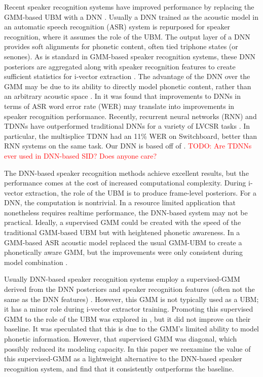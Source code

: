 \documentclass{article}
\newcommand\davidnote[1]{\textcolor{red}{#1}}
\begin{document}
Recent speaker recognition systems have improved performance by replacing 
the GMM-based UBM with a DNN \cite{lei2014, garcia2014}. 
Usually a DNN trained as the acoustic model in
an automatic speech recognition (ASR) system is repurposed for
speaker recognition, where it assumes the role of the UBM.
The output layer of a DNN provides soft alignments for
phonetic content, often tied triphone states (or senones). As is standard 
in GMM-based speaker recognition systems, these DNN posteriors are aggregated
along with speaker recognition features to create sufficient statistics for
i-vector extraction \cite{ivector}. The advantage of the DNN over the GMM may
be due to its ability to directly model phonetic content, rather than an arbitrary
acoustic space \cite{lei2014, kenny2014deep, garcia2014}. In \cite{garcia2014} it was found that
improvements to DNNs in terms of ASR word error rate (WER) may translate into 
improvements in speaker
recognition performance. Recently, recurrent neural networks (RNN) and TDNNs \cite{tdnn} have
outperformed traditional DNNs for a variety of LVCSR tasks \cite{lstm, saon2014, multisplice}.
In particular, the multisplice TDNN \cite{multisplice} had an 11\% WER
on Switchboard, better than RNN systems on the same task. 
Our DNN is based off of \cite{multisplice}. \davidnote{TODO: Are TDNNs ever used in
DNN-based SID? Does anyone care?}

The DNN-based speaker recognition methods achieve excellent results, but the
performance comes at the cost of increased computational complexity. During
i-vector extraction, the role of the UBM is to produce frame-level posteriors.
For a DNN, the computation is nontrivial. In a resource limited application
that nonetheless requires realtime performance, the DNN-based system may
not be practical. Ideally, a supervised GMM could be created with the 
speed of the traditional GMM-based UBM but with heightened phonetic awareness.
In \cite{omar2010} a GMM-based ASR acoustic model replaced the usual GMM-UBM
to create a phonetically aware GMM, but the improvements were only consistent
during model combination \cite{omar2010}.

Usually DNN-based speaker recognition systems employ a supervised-GMM
derived from the DNN posteriors and speaker recognition features (often
not the same as the DNN features) \cite{lei2014, garcia2014, kenny2014deep}.
However, this GMM is not typically
used as a UBM; it has a minor role during i-vector extractor training.
Promoting this supervised GMM to the role of the UBM was explored
in \cite{lei2014}, but it did not improve on their baseline.
It was speculated that this is due
to the GMM's limited ability to model phonetic information. However,
that supervised GMM was diagonal, which possibly
reduced its modeling capacity. In this paper we reexamine the 
value of this supervised-GMM as a lightweight alternative to the DNN-based
speaker recognition system, and find that it consistently outperforms the
baseline.
\end{document}
